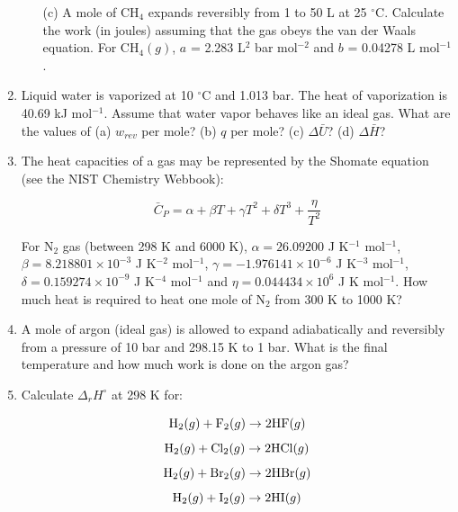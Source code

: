 \begin{enumerate}
\begin{itemize}
\item[(c)] A mole of CH$_4$ expands reversibly from 1 to 50 L at 25 $^\circ$C. Calculate the work (in joules) assuming that the gas obeys the van der Waals equation. For CH$_4(g)$, $a$ = 2.283 L$^2$ bar mol$^{-2}$ and $b$ = 0.04278 L mol$^{-1}$.

\end{itemize}


\item Liquid water is vaporized at 10 $^\circ$C and 1.013 bar. The heat of vaporization is 40.69 kJ mol$^{-1}$. Assume that water vapor behaves like an ideal gas. What are the values of (a) $w_{rev}$ per mole? (b) $q$ per mole? (c) $\Delta \bar{U}$? (d) $\Delta \bar{H}$?


\item The heat capacities of a gas may be represented by the Shomate equation (see the NIST Chemistry Webbook):

$$\bar{C}_P = \alpha + \beta T + \gamma T^2 + \delta T^3 + \frac{\eta}{T^2}$$

For N$_2$ gas (between 298 K and 6000 K), $\alpha = 26.09200$ J K$^{-1}$ mol$^{-1}$, $\beta = 8.218801\times 10^{-3}$ J K$^{-2}$ mol$^{-1}$, $\gamma = -1.976141\times 10^{-6}$ J K$^{-3}$ mol$^{-1}$, $\delta = 0.159274\times 10^{-9}$ J K$^{-4}$ mol$^{-1}$ and $\eta = 0.044434\times 10^{6}$ J K mol$^{-1}$. How much heat is required to heat one mole of N$_2$ from 300 K to 1000 K?


\item A mole of argon (ideal gas) is allowed to expand adiabatically and reversibly from a pressure of 10 bar and 298.15 K to 1 bar. What is the final temperature and how much work is done on the argon gas?


\item Calculate $\Delta_rH^\circ$ at 298 K for:

$$\textnormal{H}_2(g) + \textnormal{F}_2(g) \rightarrow 2\textnormal{HF}(g)$$
$$\textnormal{H}_2(g) + \textnormal{Cl}_2(g) \rightarrow 2\textnormal{HCl}(g)$$
$$\textnormal{H}_2(g) + \textnormal{Br}_2(g) \rightarrow 2\textnormal{HBr}(g)$$
$$\textnormal{H}_2(g) + \textnormal{I}_2(g) \rightarrow 2\textnormal{HI}(g)$$


\end{enumerate}
